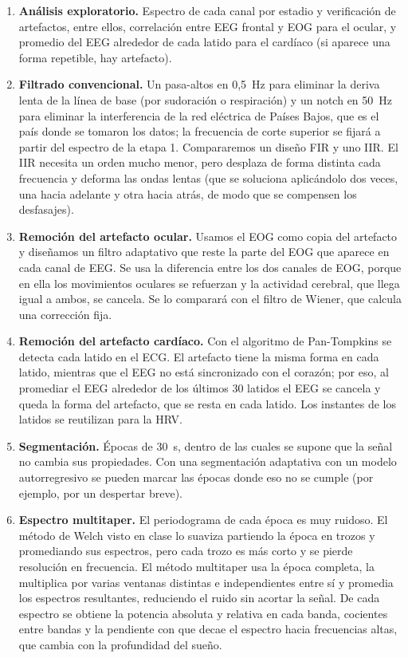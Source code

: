 \documentclass[11pt,a4paper]{article}
\begin{document}
\begin{enumerate}[label=\textbf{\arabic*.}, leftmargin=1.6em, itemsep=6pt, topsep=4pt]
\item \textbf{Análisis exploratorio.} Espectro de cada canal por
  estadio y verificación de artefactos, entre ellos, correlación entre EEG frontal y
  EOG para el ocular, y promedio del EEG alrededor de cada latido para
  el cardíaco (si aparece una forma repetible, hay artefacto).

\item \textbf{Filtrado convencional.} Un pasa-altos en 0,5~Hz para eliminar la
  deriva lenta de la línea de base (por sudoración o respiración) y un
  notch en 50~Hz para eliminar la interferencia de la red eléctrica de Países
  Bajos, que es el país donde se tomaron los datos; la frecuencia de corte superior se fijará a partir del espectro
  de la etapa 1. Compararemos un diseño FIR y uno IIR. El IIR necesita un
  orden mucho menor, pero desplaza de forma distinta cada frecuencia y
  deforma las ondas lentas (que se soluciona aplicándolo dos veces, una
  hacia adelante y otra hacia atrás, de modo que se compensen los desfasajes).

\item \textbf{Remoción del artefacto ocular.} Usamos el EOG como copia
  del artefacto y diseñamos un filtro adaptativo que reste la parte del
  EOG que aparece en cada canal de EEG. Se usa la diferencia entre los dos canales de EOG,
  porque en ella los movimientos oculares se refuerzan y la actividad
  cerebral, que llega igual a ambos, se cancela. Se lo comparará con el filtro de Wiener, que calcula una corrección fija.

\item \textbf{Remoción del artefacto cardíaco.} Con el algoritmo de
  Pan-Tompkins se detecta cada latido en el ECG. El
  artefacto tiene la misma forma en cada latido, mientras que el EEG no
  está sincronizado con el corazón; por eso, al promediar el EEG
  alrededor de los últimos 30 latidos el EEG se cancela y queda la forma
  del artefacto, que se resta en cada latido. Los instantes de los
  latidos se reutilizan para la HRV.

\item \textbf{Segmentación.} Épocas de 30~s, dentro de las cuales se
  supone que la señal no cambia sus propiedades. Con una segmentación
  adaptativa con un modelo autorregresivo se pueden marcar las épocas
  donde eso no se cumple (por ejemplo, por un despertar breve).

\item \textbf{Espectro multitaper.} El periodograma de cada época es muy
  ruidoso. El método de Welch visto en clase lo suaviza partiendo la
  época en trozos y promediando sus espectros, pero cada trozo es más
  corto y se pierde resolución en frecuencia. El método multitaper
  usa la época completa, la multiplica por varias
  ventanas distintas e independientes entre sí y promedia los espectros
  resultantes, reduciendo el ruido sin acortar la señal. De cada espectro se obtiene
  la potencia absoluta y relativa en cada banda, cocientes entre bandas
  y la pendiente con que decae el espectro hacia frecuencias altas, que
  cambia con la profundidad del sueño.


\end{enumerate}
\end{document}
